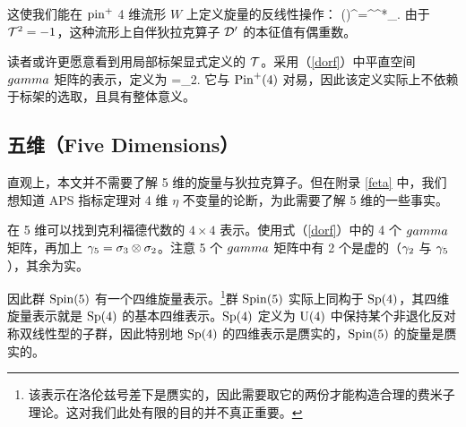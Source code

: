 
这使我们能在 ${\mathrm{pin}}^+$ 4 维流形 $W$ 上定义旋量的反线性操作：
\be\label{orf}(\T\psi)^\alpha =\veps^{\alpha\beta}\psi^*_\beta. \ee
由于 ${\mathcal T}^2=-1$，这种流形上自伴狄拉克算子 ${\mathcal D}'$ 的本征值有偶重数。

读者或许更愿意看到用局部标架显式定义的 ${\mathcal T}$。采用（\ref{dorf}）中平直空间 $\\gamma$ 矩阵的表示，定义为
\be\label{norf}\T=\K\gamma_2\bg. \ee
它与 ${\mathrm{Pin}}^+(4)$ 对易，因此该定义实际上不依赖于标架的选取，且具有整体意义。


\subsection{五维（Five Dimensions）}\label{fvod}

直观上，本文并不需要了解 5 维的旋量与狄拉克算子。但在附录 \ref{feta} 中，我们想知道 APS 指标定理对 4 维 $\eta$ 不变量的论断，为此需要了解 5 维的一些事实。


在 5 维可以找到克利福德代数的 $4\times 4$ 表示。使用式（\ref{dorf}）中的 4 个 $\\gamma$ 矩阵，再加上 ${\gamma}_5=\sigma_3\otimes \sigma_2$。注意 5 个 $\\gamma$ 矩阵中有 2 个是虚的（${\gamma}_2$ 与 ${\gamma}_5$），其余为实。

因此群 ${\mathrm{Spin}}(5)$ 有一个四维旋量表示。\footnote{该表示在洛伦兹号差下是赝实的，因此需要取它的两份才能构造合理的费米子理论。这对我们此处有限的目的并不真正重要。}群 ${\mathrm{Spin}}(5)$ 实际上同构于 ${\mathrm{Sp}}(4)$，其四维旋量表示就是 ${\mathrm{Sp}}(4)$ 的基本四维表示。${\mathrm{Sp}}(4)$ 定义为 ${\mathrm U}(4)$ 中保持某个非退化反对称双线性型的子群，因此特别地 ${\mathrm{Sp}}(4)$ 的四维表示是赝实的，${\mathrm{Spin}}(5)$ 的旋量是赝实的。


